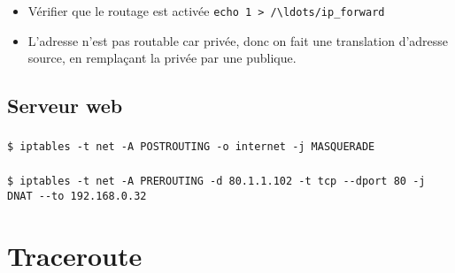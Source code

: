 \documentclass{article}
\begin{document}
\begin{itemize}
    \item Vérifier que le routage est activée \verb|echo 1 > /\ldots/ip_forward|
    \item L'adresse n'est pas routable car privée, donc on fait une translation d'adresse source, en remplaçant la privée par une publique.
\end{itemize}

\subsection{Serveur web}


\subsubsection{}

\verb|$ iptables -t net -A POSTROUTING -o internet -j MASQUERADE|

\subsubsection{}

    
\verb|$ iptables -t net -A PREROUTING -d 80.1.1.102 -t tcp --dport 80 -j DNAT --to 192.168.0.32|

\section{Traceroute}

\subsection{}
\subsection{}
\subsection{}
\end{document}
